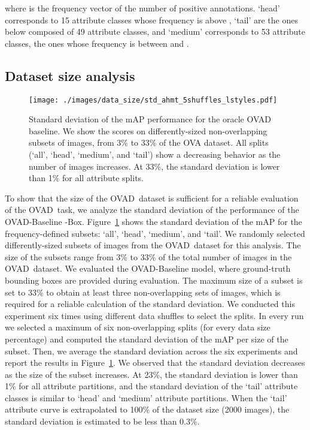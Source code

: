\documentclass[10pt,twocolumn,letterpaper]{article}
\newcommand{\modelname}{OVAD-Baseline }
\newcommand{\datasetname}{OVAD}
\newcommand{\taskname}{OVAD}
\begin{document}
where  is the frequency vector of the number of positive annotations. `head' corresponds to 15 attribute classes whose frequency is above , `tail' are the ones below  composed of 49 attribute classes, and `medium' corresponds to 53 attribute classes, the ones whose frequency is between  and .



\subsection{Dataset size analysis}
\begin{figure}[ht]
\texttt{[image: ./images/data\_size/std\_ahmt\_5shuffles\_lstyles.pdf]}
\centering
\caption{Standard deviation of the mAP performance for the oracle OVAD baseline. We show the scores on differently-sized non-overlapping subsets of images, from 3\% to 33\% of the OVA dataset. All splits (`all', `head', `medium', and `tail') show a decreasing behavior as the number of images increases. At 33\%, the standard deviation is lower than 1\% for all attribute splits.}
\label{fig:dataset_size}
\end{figure}

To show that the size of the \datasetname\ dataset is sufficient for a reliable evaluation of the \taskname\ task, we analyze the standard deviation of the performance of the \modelname-Box. Figure~\ref{fig:dataset_size} shows the standard deviation of the mAP for the frequency-defined subsets: `all', `head', `medium', and `tail'. 
We randomly selected differently-sized subsets of images from the \datasetname\ dataset for this analysis. The size of the subsets range from 3\% to 33\% of the total number of images in the \datasetname\ dataset. We evaluated the \modelname{} model, where ground-truth bounding boxes are provided during evaluation.
The maximum size of a subset is set to 33\% to obtain at least three non-overlapping sets of images, which is required for a reliable calculation of the standard deviation. 
We conducted this experiment six times using different data shuffles to select the splits. In every run we selected a maximum of six non-overlapping splits (for every data size percentage) and computed the standard deviation of the mAP per size of the subset. Then, we average the standard deviation across the six experiments and report the results in Figure~\ref{fig:dataset_size}. 
We observed that the standard deviation decreases as the size of the subset increases. At 23\%, the standard deviation is lower than 1\% for all attribute partitions, and the standard deviation of the `tail' attribute classes is similar to `head' and `medium' attribute partitions. 
When the `tail' attribute curve is extrapolated to 100\% of the dataset size (2000 images), the standard deviation is estimated to be less than 0.3\%.
 
\end{document}
